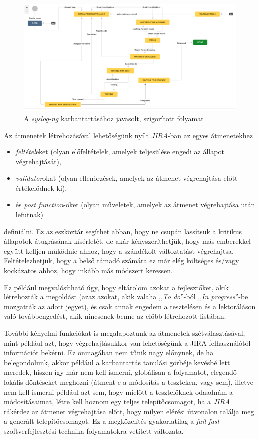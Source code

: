 \begin{figure}[h]
    \includegraphics[width=\textwidth, keepaspectratio]{figures/newmt.png}
    \centering
    \caption{A \emph{syslog-ng} karbantartásához javasolt, szigorított folyamat}
    \label{fig:newmt}
\end{figure}

\FloatBarrier

Az átmenetek létrehozásával lehetőségünk nyílt \emph{JIRA}-ban az egyes átmenetekhez
\begin{itemize}
    \item \emph{feltétel}eket (olyan előfeltételek, amelyek teljesülése engedi az állapot
        végrehajtását),
    \item \emph{validator}okat (olyan ellenőrzések, amelyek az átmenet végrehajtása előtt
        értékelődnek ki),
    \item és \emph{post function}-öket (olyan műveletek, amelyek az átmenet végrehajtása után
        lefutnak)
\end{itemize}
definiálni. Ez az eszköztár segíthet abban, hogy ne csupán lassítsuk a kritikus állapotok
átugrásának kísérletét, de akár kényszeríthetjük, hogy más emberekkel együtt kelljen működnie ahhoz,
hogy a szándékolt változtatást végrehajtsa. Feltételezhetjük, hogy a belső támadó számára ez már
elég költséges és/vagy kockázatos ahhoz, hogy inkább más módszert keressen.

Ez például megvalósítható úgy, hogy eltárolom azokat a fejlesztőket, akik létrehozták a megoldást
(azaz azokat, akik valaha ,,\emph{To do}''-ból ,,\emph{In progress}''-be mozgatták az adott jegyet),
és csak annak engedem a tesztelésen és a lektoráláson való továbbengedést, akik nincsenek benne az
előbb létrehozott listában.

További kényelmi funkciókat is megalapoztunk az átmenetek szétválasztásával, mint például azt, hogy
végrehajtásukkor van lehetőségünk a JIRA felhasználótól információt bekérni.  Ez önmagában nem tűnik
nagy előnynek, de ha belegondolunk, akkor például a karbantartás tanulási görbéje kevésbé lett
meredek, hiszen így már nem kell ismerni, globálisan a folyamatot, elegendő lokális döntéseket
meghozni (átment-e a módosítás a teszteken, vagy sem), illetve nem kell ismerni például azt sem,
hogy mielőtt a tesztelőknek odaadnám a módosításaimat, létre kell hoznom egy teljes
telepítőcsomagot, ha a \emph{JIRA} rákérdez az átmenet végrehajtása előtt, hogy milyen elérési
útvonalon találja meg a generált telepítőcsomagot. Ez a megközelítés gyakorlatilag
a \emph{fail-fast} \cite{shore2004fail} szoftverfejlesztési technika folyamatokra vetített
változata.

